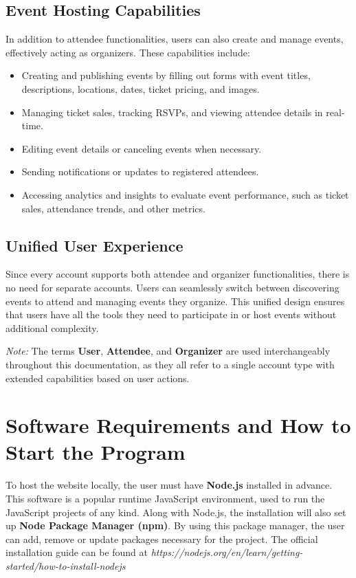 \subsection{Event Hosting Capabilities}
In addition to attendee functionalities, users can also create and manage events, effectively acting as organizers. These capabilities include:
\begin{itemize}
    \item Creating and publishing events by filling out forms with event titles, descriptions, locations, dates, ticket pricing, and images.
    \item Managing ticket sales, tracking RSVPs, and viewing attendee details in real-time.
    \item Editing event details or canceling events when necessary.
    \item Sending notifications or updates to registered attendees.
    \item Accessing analytics and insights to evaluate event performance, such as ticket sales, attendance trends, and other metrics.
\end{itemize}

\subsection{Unified User Experience}
Since every account supports both attendee and organizer functionalities, there is no need for separate accounts. Users can seamlessly switch between discovering events to attend and managing events they organize. This unified design ensures that users have all the tools they need to participate in or host events without additional complexity.

\textit{Note:} The terms \textbf{User}, \textbf{Attendee}, and \textbf{Organizer} are used interchangeably throughout this documentation, as they all refer to a single account type with extended capabilities based on user actions.






\section{Software Requirements and How to Start the
Program}

To host the website locally, the user must have \textbf{Node.js}\cite{nodejs} installed
in advance. This software is a popular runtime JavaScript environment, used to run
the JavaScript\cite{javascript} projects of any kind. Along with Node.js, the installation will also set
up \textbf{Node Package Manager (npm)}\cite{npm}. By using this package
manager, the user can add, remove or update packages necessary for the project.
The official installation guide can be found at \textit{https://nodejs.org/en/learn/getting-started/how-to-install-nodejs}


